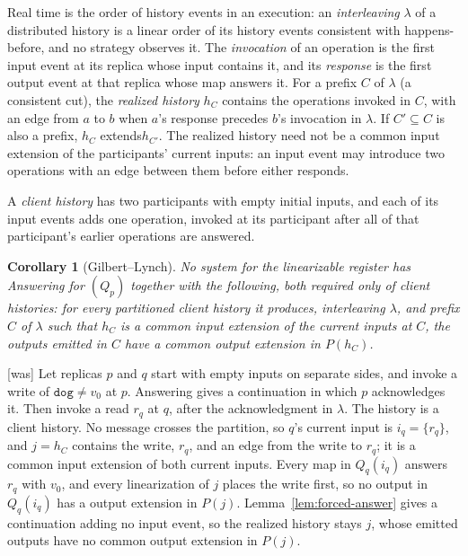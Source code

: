 \documentclass[sigconf]{cidr-2027}
\newtheorem{corollary}{Corollary}
\theoremstyle{remark}
\newcommand{\inrel}{extends\xspace}          %
\newcommand{\indesc}{input extension\xspace} %
\newcommand{\outnoun}{output extension\xspace}%
\newcommand{\fiber}[1]{P(#1)}
\newcommand{\dog}{\texttt{dog}}
\begin{document}
Real time is the order of history events in an execution: an \emph{interleaving}
$\lambda$ of a distributed history is a linear order of its history events consistent
with happens-before, and no strategy observes it.  The \emph{invocation} of an
operation is the first input event at its replica whose input contains it,
and its \emph{response} is the first output event at that replica whose map
answers it.  For a prefix $C$ of $\lambda$ (a consistent cut), the
\emph{realized history} $h_C$ contains the operations invoked in $C$, with an
edge from $a$ to $b$ when $a$'s response precedes $b$'s invocation in
$\lambda$.  If $C'\subseteq C$ is also a prefix, $h_C$ \inrel $h_{C'}$.  The
realized history need not be a common \indesc of the participants' current
inputs: an input event may introduce two operations with an edge between them
before either responds.

A \emph{client history} has two participants with empty initial inputs, and
each of its input events adds one operation, invoked at its participant after
all of that participant's earlier operations are answered.

\begin{corollary}[Gilbert--Lynch]
\label{cor:gilbert-lynch}
No system for the linearizable register has Answering for $(Q_p)$ together
with the following, both required only of client histories: for every
partitioned client history it produces, interleaving $\lambda$, and prefix $C$
of $\lambda$ such that $h_C$ is a common \indesc of the current inputs at $C$,
the outputs emitted in $C$ have a common \outnoun in $\fiber{h_C}$.
\end{corollary}



{\footnotesize\color{black!50}\noindent\textsf{[was]} Let replicas $p$ and $q$ start with empty inputs on separate sides, and
invoke a write of $\dog\neq v_0$ at $p$.  Answering gives a continuation in
which $p$ acknowledges it.  Then invoke a read $r_q$ at $q$, after the
acknowledgment in $\lambda$.  The history is a client history.  No message
crosses the partition, so $q$'s current input is $i_q=\{r_q\}$, and $j=h_C$
contains the write, $r_q$, and an edge from the write to $r_q$; it is a common
\indesc of both current inputs.  Every map in $Q_q(i_q)$ answers $r_q$ with
$v_0$, and every linearization of $j$ places the write first, so no output in
$Q_q(i_q)$ has a \outnoun in $\fiber{j}$.  Lemma~\ref{lem:forced-answer}
gives a continuation adding no input event, so the realized history stays
$j$, whose emitted outputs have no common \outnoun in $\fiber{j}$.\par}
\end{document}
